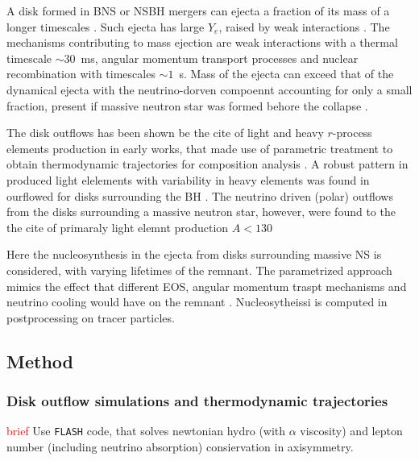 \documentclass[11pt,a4paper,headinclude=true,DIV=14,BCOR=8mm,chapterprefix,listof=totoc,twoside,openright,abstracton]{scrbook}
\newcommand{\red}[1]{\textcolor{red}{#1}}
\begin{document}
A disk formed in BNS or NSBH mergers can ejecta a fraction of its mass of a longer timescales \cite{(e.g., Ruffert et al., 1997; Lee et al., 2009; Metzger et al., 2009b}. Such ejecta has large $Y_e$, raised by weak interactions \cite{(e.g., Dessart et al., 2009; Fernandez and Metzger, 2013; Perego et al., 2014)}. The mechanisms contributing to mass ejection are weak interactions with a thermal timescale $\sim30$~ms, angular momentum transport processes and nuclear recombination with timescales $\sim1$~s. Mass of the ejecta can exceed that of the dynamical ejecta \cite{e.g., Fernandez and Metzger, 2016} with the neutrino-dorven compoennt accounting for only a small fraction, present if massive neutron star was formed behore the collapse \cite{(Dessart et al., 2009; Fernandez and Metzger, 2013; Metzger and Fernandez, 2014; Just et al., 2015}. 

The disk outflows has been shown be the cite of light and heavy $r$-process elements production in early works, that made use of parametric treatment to obtain thermodynamic trajectories for composition analysis \cite{(e.g., Surman et al., 2008; Wanajo and Janka, 2012)}. A robust pattern in produced light elelements with variability in heavy elements was found in ourflowed for disks surrounding the BH \cite{Just et al., 2015; Wu et al., 2016)}. The neutrino driven (polar) outflows from the disks surrounding a massive neutron star, however, were found to the the cite of primaraly light elemnt production $A<130$ \cite{Martin et al., 2015, Perego et al., 2014}
 
Here the nucleosynthesis in the ejecta from disks surrounding massive NS is considered, with varying lifetimes of the remnant. The parametrized approach mimics the effect that different EOS, angular momentum traspt mechanisms and neutrino cooling would have on the remnant \cite{(e.g., Paschalidis et al., 2012; Kaplan et al., 2014).}. Nucleosytheissi is computed in postprocessing on tracer particles. 


\subsection{Method}
\subsubsection{Disk outflow simulations and thermodynamic trajectories}
\red{brief}
Use \texttt{FLASH} code, that solves newtonian hydro (with $\alpha$ viscosity) and lepton number (including neutrino absorption) consiervation in axisymmetry. 
\end{document}
